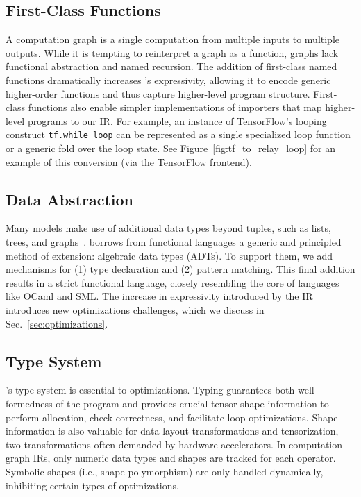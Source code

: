 \subsection*{First-Class Functions}

A computation graph is a single computation
  from multiple inputs to multiple outputs.
While it is tempting to reinterpret a graph as a function,
  graphs lack functional abstraction and named recursion.
The addition of first-class named functions dramatically increases
  \relay's expressivity, allowing it to encode generic
  higher-order functions and thus capture higher-level program structure.
First-class functions also enable simpler implementations
  of importers that map higher-level programs to our IR.
For example, an instance of TensorFlow's looping construct \verb|tf.while_loop|
  can be represented as a single specialized loop function
  or a generic fold over the loop state.
See Figure~\ref{fig:tf_to_relay_loop} for an example of this conversion (via
  the \relay TensorFlow frontend).

\subsection*{Data Abstraction}
Many models make use of additional data types beyond
  tuples, such as lists, trees, and graphs~\cite{char-rnn, tree_lstm, graph_lstm}.
\relay borrows from functional languages
  a generic and principled method of extension:
  algebraic data types (ADTs).
To support them, we add mechanisms for
  (1) type declaration and
  (2) pattern matching.
This final addition results in a strict functional language,
  closely resembling the core of languages like OCaml and SML.
The increase in expressivity introduced by the \relay IR introduces
  new optimizations challenges, which we
  discuss in Sec.~\ref{sec:optimizations}.

\subsection{Type System}
\label{subsec:type_system}

\relay's type system is essential
  to optimizations.
Typing guarantees both well-formedness of the program
  and provides crucial tensor shape information to perform allocation,
  check correctness, and facilitate loop optimizations.
Shape information is also valuable for data layout transformations and tensorization,
  two transformations often demanded by hardware accelerators.
In computation graph IRs, only numeric data types
  and shapes are tracked for each operator.
Symbolic shapes (i.e., shape polymorphism) are only handled
  dynamically, inhibiting certain types of optimizations.

